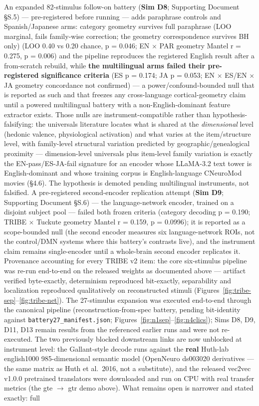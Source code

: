 \documentclass[11pt,twocolumn]{article}
\theoremstyle{plain}
\begin{document}
An expanded 82-stimulus follow-on battery (\textbf{Sim D8}; Supporting Document \S{}S.5) — pre-registered before running — adds paraphrase controls and Spanish/Japanese arms: category geometry survives full paraphrase (LOO marginal, fails family-wise correction; the geometry correspondence survives BH only) (LOO 0.40 vs 0.20 chance, p = 0.046; EN $\times$ PAR geometry Mantel r = 0.275, p = 0.006) and the pipeline reproduces the registered English result after a from-scratch rebuild, while \textbf{the multilingual arms failed their pre-registered significance criteria} (ES p = 0.174; JA p = 0.053; EN $\times$ ES/EN $\times$ JA geometry concordance not confirmed) — a power/confound-bounded null that is reported as such and that freezes any cross-language cortical-geometry claim until a powered multilingual battery with a non-English-dominant feature extractor exists. Those nulls are instrument-compatible rather than hypothesis-falsifying: the universals literature locates what is shared at the \textit{dimensional} level (hedonic valence, physiological activation) and what varies at the item/structure level, with family-level structural variation predicted by geographic/genealogical proximity \citep{jackson2019,xu2020,karjus2021} --- dimension-level universals plus item-level family variation is exactly the EN-pass/ES-JA-fail signature for an encoder whose LLaMA-3.2 text tower is English-dominant and whose training corpus is English-language CNeuroMod movies \citep{dascoli2025} (\S{}4.6). The hypothesis is demoted pending multilingual instruments, not falsified. A pre-registered second-encoder replication attempt (\textbf{Sim D9}; Supporting Document \S{}S.6) — the \citet{tuckute2024} language-network encoder, trained on a disjoint subject pool — failed both frozen criteria (category decoding p = 0.190; TRIBE $\times$ Tuckute geometry Mantel r = 0.159, p = 0.0996); it is reported as a scope-bounded null (the second encoder measures six language-network ROIs, not the control/DMN systems where this battery's contrasts live), and the instrument claim remains single-encoder until a whole-brain second encoder replicates it. Provenance accounting for every TRIBE v2 item: the core six-stimulus pipeline was re-run end-to-end on the released weights as documented above --- artifact verified byte-exactly, determinism reproduced bit-exactly, separability and localization reproduced qualitatively on reconstructed stimuli (Figures~\ref{fig:tribe-sep}--\ref{fig:tribe-net}). The 27-stimulus expansion was executed end-to-end through the canonical pipeline (reconstruction-from-spec battery, pending bit-identity against \texttt{battery27\_manifest.json}; Figures~\ref{fig:n1sep}--\ref{fig:n4clics}); Sims D8, D9, D11, D13 remain results from the referenced earlier runs and were not re-executed. The two previously blocked downstream links are now unblocked at instrument level: the Gallant-style decode runs against the \textbf{real} Huth-lab english1000 985-dimensional semantic model (OpenNeuro ds003020 derivatives --- the same matrix as Huth et al.\ 2016, not a substitute), and the released vec2vec v1.0.0 pretrained translators \citep{jha2025} were downloaded and run on CPU with real transfer metrics (the gte $\to$ gtr demo above). What remains open is narrower and stated exactly: full 
\end{document}
